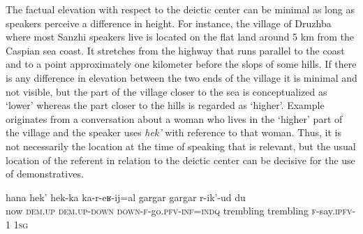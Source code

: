 The factual elevation with respect to the deictic center can be minimal as long as speakers perceive a difference in height. For instance, the village of Druzhba where most Sanzhi speakers live is located on the flat land around 5 km from the Caspian sea coast. It stretches from the highway that runs parallel to the coast and to a point approximately one kilometer before the slops of some hills. If there is any difference in elevation between the two ends of the village it is minimal and not visible, but the part of the village closer to the sea is conceptualized as ‘lower' whereas the part closer to the hills is regarded as `higher'. Example  originates from a conversation about a woman who lives in the ‘higher' part of the village and the speaker uses \textit{hek'} with reference to that woman. Thus, it is not necessarily the location at the time of speaking that is relevant, but the usual location of the referent in relation to the deictic center can be decisive for the use of demonstratives.

\begin{exe}
		\label{If now she comes from over there I am trembling.}
	\sn
	\gll	hana	hek'	hek-ka	ka-r-eʁ-ij=al		gargar	gargar	r-ik'-ud	du \\
		now	\textsc{dem.up}	\textsc{dem.up-down}	\textsc{down-f}-go.\textsc{pfv}-\textsc{inf=indq}	trembling	trembling	\textsc{f-}say.\textsc{ipfv-1}	\textsc{1sg}\\		
	\glt	{}

\end{exe}

